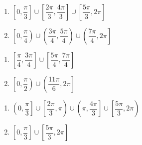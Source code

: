 \documentclass{ximera}
\begin{document}
\begin{multicols}{2}

\begin{enumerate}

\setcounter{enumi}{\value{HW}}

\item $\left[ 0, \dfrac{\pi}{3} \right] \cup \left[ \dfrac{2\pi}{3}, \dfrac{4\pi}{3} \right] \cup \left[ \dfrac{5\pi}{3}, 2\pi \right]$
\item $\left[ 0, \dfrac{\pi}{4} \right) \cup \left( \dfrac{3\pi}{4}, \dfrac{5\pi}{4} \right) \cup \left( \dfrac{7\pi}{4}, 2\pi \right]$

\setcounter{HW}{\value{enumi}}

\end{enumerate}

\end{multicols}

\begin{multicols}{2}

\begin{enumerate}

\setcounter{enumi}{\value{HW}}

\item $\left[ \dfrac{\pi}{4}, \dfrac{3\pi}{4} \right] \cup \left[ \dfrac{5\pi}{4}, \dfrac{7\pi}{4} \right]$
\item $\left[ 0, \dfrac{\pi}{2} \right) \cup \left( \dfrac{11\pi}{6}, 2\pi \right]$

\setcounter{HW}{\value{enumi}}

\end{enumerate}

\end{multicols}

\begin{multicols}{2}

\begin{enumerate}

\setcounter{enumi}{\value{HW}}

\item \small $\left( 0, \dfrac{\pi}{3} \right] \cup \left[ \dfrac{2\pi}{3}, \pi \right) \cup \left( \pi, \dfrac{4\pi}{3} \right] \cup \left[ \dfrac{5\pi}{3}, 2\pi \right)$ \normalsize
\item  $\left[0, \dfrac{\pi}{3}\right] \cup \left[\dfrac{5\pi}{3}, 2\pi\right]$

\setcounter{HW}{\value{enumi}}

\end{enumerate}

\end{multicols}
\end{document}
